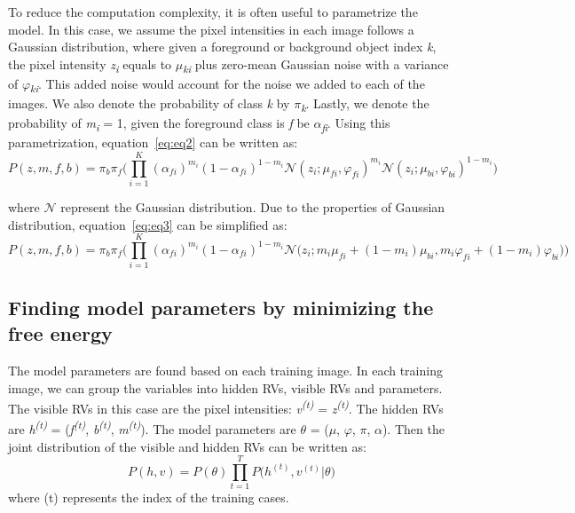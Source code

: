 \documentclass{article} %
\begin{document}
To reduce the computation complexity, it is often useful to parametrize the model. In this case, we assume the pixel intensities in each image follows a Gaussian distribution, where given a foreground or background object index \textit{k}, the pixel intensity \textit{z}\textsubscript{\textit{i}} equals to \textit{$\mu$}\textsubscript{\textit{ki}} plus zero-mean Gaussian noise with a variance of \textit{$\varphi$}\textsubscript{\textit{ki}}. This added noise would account for the noise we added to each of the images. We also denote the probability of class \textit{k} by \textit{$\pi$}\textsubscript{\textit{k}}. Lastly, we denote the probability of \textit{m}\textsubscript{\textit{i}} = 1, given the foreground class is \textit{f} be \textit{$\alpha$}\textsubscript{\textit{fi}}. Using this parametrization, equation~\ref{eq:eq2} can be written as:
\begin{equation}
P(z,m,f,b) = \pi_{b} \pi_{f} \Bigg( \prod_{i=1}^K {(\alpha_{fi})}^{m_{i}} {(1-\alpha_{fi})}^{1-m_{i}} \mathcal{N}(z_i;\mu_{fi},\varphi_{fi})^{m_{i}}\mathcal{N}(z_i;\mu_{bi},\varphi_{bi})^{1-m_{i}} \Bigg)
\label{eq:eq3}
\end{equation}

where $\mathcal{N}$ represent the Gaussian distribution. Due to the properties of Gaussian distribution, equation~\ref{eq:eq3} can be simplified as:
\begin{equation}
P(z,m,f,b) = \pi_{b} \pi_{f} \Bigg( \prod_{i=1}^K {(\alpha_{fi})}^{m_{i}} {(1-\alpha_{fi})}^{1-m_{i}} \mathcal{N}\Big( z_i;{m_{i}}\mu_{fi} + (1-m_{i})\mu_{bi}, {m_{i}}\varphi_{fi} + (1-m_{i})\varphi_{bi}\Big)\Bigg)
\label{eq:eq4}
\end{equation}

\subsection{Finding model parameters by minimizing the free energy }
\label{free_energy}
The model parameters are found based on each training image. In each training image, we can group the variables into hidden RVs, visible RVs and parameters. The visible RVs in this case are the pixel intensities: \textit{v}\textsuperscript{\textit{(t)}} = \textit{z}\textsuperscript{\textit{(t)}}. The hidden RVs are \textit{h}\textsuperscript{\textit{(t)}} = (\textit{f}\textsuperscript{\textit{(t)}}, \textit{b}\textsuperscript{\textit{(t)}}, \textit{m}\textsuperscript{\textit{(t)}}). The model parameters are \textit{$\theta$} = (\textit{$\mu$}, \textit{$\varphi$}, \textit{$\pi$}, \textit{$\alpha$}). Then the joint distribution of the visible and hidden RVs can be written as:
\begin{equation}
P(h,v) = P(\theta) \prod_{t=1}^TP\Big(h^{(t)}, v^{(t)}|\theta\Big) 
\label{eq:eq5}
\end{equation}
where (t) represents the index of the training cases.
\end{document}
